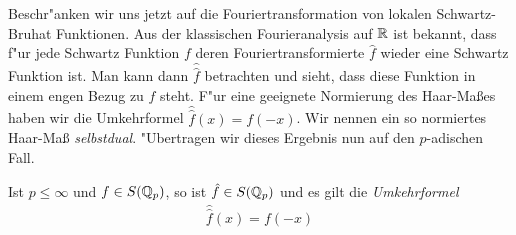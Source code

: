 		Beschr"anken wir uns jetzt auf die Fouriertransformation von lokalen Schwartz-Bruhat Funktionen.
		Aus der klassischen Fourieranalysis auf $\mathbb{R}$ ist bekannt, dass f"ur jede Schwartz Funktion $f$ deren Fouriertransformierte $\hat{f}$ wieder eine Schwartz Funktion ist.
		Man kann dann $\hat{\hat{f}}$ betrachten und sieht, dass diese Funktion in einem engen Bezug zu $f$ steht. 
		F"ur eine geeignete Normierung des Haar-Maßes haben wir die Umkehrformel $\hat{\hat{f}}(x)=f(-x)$.
		Wir nennen ein so normiertes Haar-Maß \emph{selbstdual}.
		"Ubertragen wir dieses Ergebnis nun auf den $p$-adischen Fall.
		\begin{satz}\label{satz:lokal:umkehrformel}
			Ist $p\leq\infty$ und $f\in S({\mathbb{Q}_p})$, so ist $\hat{f} \in S({\mathbb{Q}_p})$ und es gilt die \emph{Umkehrformel}
			\begin{align*}
				\hat{\hat{f}}(x) = f(-x)
			\end{align*}
		\end{satz}
